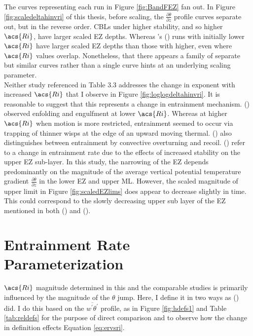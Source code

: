 The curves representing each run in Figure \ref{fig:BandFEZ} fan out.  In Figure \ref{fig:scaledeltahinvri} of this thesis, before scaling, the $\frac{\partial \overline{\theta}}{\partial z}$ profile curves separate out, but in the reverse order.  \acs{CBL}s under higher stability, and so higher $\acs{Ri}$, have larger scaled \acs{EZ} depths.  Whereas \citeauthor{BrooksFowler2}'s (\citeyear{BrooksFowler2}) runs with initially lower $\acs{Ri}$ have larger scaled \acs{EZ} depths than those with higher, even where $\acs{Ri}$ values overlap. Nonetheless, that there appears a family of separate but similar curves rather than a single curve hints at an underlying scaling parameter.\\     

Neither study referenced in Table 3.3 addresses the change in exponent with increased $\acs{Ri}$ that I observe in Figure \ref{fig:loglogdeltahinvri}.  It is reasonable to suggest that this represents a change in entrainment mechanism. \citeauthor{SullMoengStev} (\citeyear{SullMoengStev}) observed enfolding and engulfment at lower $\acs{Ri}$.  Whereas at higher $\acs{Ri}$ when motion is more restricted, entrainment seemed to occur via trapping of thinner wisps at the edge of an upward moving thermal.  \citeauthor{Turner86} (\citeyear{Turner86}) also distinguishes between entrainment by convective overturning and recoil. \citeauthor{GarciaMellado} (\citeyear{GarciaMellado}) refer to a change in entrainment rate due to the effects of increased stability on the upper \acs{EZ} sub-layer.  In this study, the narrowing of the \acs{EZ} depends predominantly on the magnitude of the average vertical potential temperature gradient $\frac{\partial \overline{\theta}}{\partial z}$ in the lower \acs{EZ} and upper \acs{ML}.  However, the scaled magnitude of upper limit in Figure \ref{fig:scaledEZlims} does appear to decrease slightly in time.  This could correspond to the slowly decreasing upper sub layer of the \acs{EZ} mentioned in both \citeauthor{GarciaMellado} (\citeyear{GarciaMellado}) and \citeauthor{FedConzMir04} (\citeyear{FedConzMir04}).\\

\section{Entrainment Rate Parameterization}
\label{sec:erparam}
$\acs{Ri}$ magnitude determined in this and the comparable studies is primarily influenced by the magnitude of the $\theta$ jump.  Here, I define it in two ways as \citeauthor{FedConzMir04} (\citeyear{FedConzMir04}) did.  I do this based on the $\overline{w^{'}\theta^{'}}$ profile, as in Figure \ref{fig:hdefs1} and Table \ref{tab:reldefs} for the purpose of direct comparison and to observe how the change in definition effects Equation \ref{eq:ervsri}.\\

